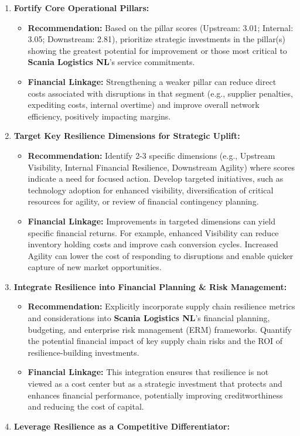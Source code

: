 \documentclass[
  oneside,
  open=any,
  fontsize=11pt]{scrbook}
\providecommand{\tightlist}{%
  \setlength{\itemsep}{0pt}\setlength{\parskip}{0pt}}
\begin{document}
\begin{enumerate}
\def\labelenumi{\arabic{enumi}.}
\tightlist
\item
  \textbf{Fortify Core Operational Pillars:}

  \begin{itemize}
  \tightlist
  \item
    \textbf{Recommendation:} Based on the pillar scores (Upstream: 3.01;
    Internal: 3.05; Downstream: 2.81), prioritize strategic investments
    in the pillar(s) showing the greatest potential for improvement or
    those most critical to \textbf{Scania Logistics NL}'s service
    commitments.
  \item
    \textbf{Financial Linkage:} Strengthening a weaker pillar can reduce
    direct costs associated with disruptions in that segment (e.g.,
    supplier penalties, expediting costs, internal overtime) and improve
    overall network efficiency, positively impacting margins.
  \end{itemize}
\item
  \textbf{Target Key Resilience Dimensions for Strategic Uplift:}

  \begin{itemize}
  \tightlist
  \item
    \textbf{Recommendation:} Identify 2-3 specific dimensions (e.g.,
    Upstream Visibility, Internal Financial Resilience, Downstream
    Agility) where scores indicate a need for focused action. Develop
    targeted initiatives, such as technology adoption for enhanced
    visibility, diversification of critical resources for agility, or
    review of financial contingency planning.
  \item
    \textbf{Financial Linkage:} Improvements in targeted dimensions can
    yield specific financial returns. For example, enhanced Visibility
    can reduce inventory holding costs and improve cash conversion
    cycles. Increased Agility can lower the cost of responding to
    disruptions and enable quicker capture of new market opportunities.
  \end{itemize}
\item
  \textbf{Integrate Resilience into Financial Planning \& Risk
  Management:}

  \begin{itemize}
  \tightlist
  \item
    \textbf{Recommendation:} Explicitly incorporate supply chain
    resilience metrics and considerations into \textbf{Scania Logistics
    NL}'s financial planning, budgeting, and enterprise risk management
    (ERM) frameworks. Quantify the potential financial impact of key
    supply chain risks and the ROI of resilience-building investments.
  \item
    \textbf{Financial Linkage:} This integration ensures that resilience
    is not viewed as a cost center but as a strategic investment that
    protects and enhances financial performance, potentially improving
    creditworthiness and reducing the cost of capital.
  \end{itemize}
\item
  \textbf{Leverage Resilience as a Competitive Differentiator:}


\end{enumerate}
\end{document}
